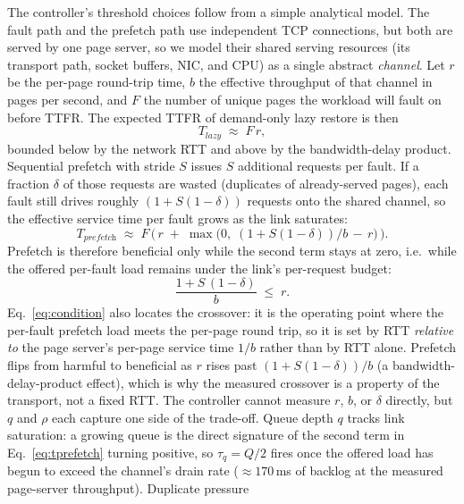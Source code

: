 \documentclass[journal]{IEEEtran}
\newcommand{\qthr}{\ensuremath{\tau_q}}
\begin{document}
The controller's threshold choices follow from a simple analytical model. The
fault path and the prefetch path use independent TCP connections, but both are
served by one page server, so we model their shared serving resources (its
transport path, socket buffers, NIC, and CPU) as a single abstract
\emph{channel}. Let $r$ be the per-page round-trip time, $b$ the
effective throughput of that channel in pages per second, and $F$ the number
of unique pages the workload will fault on before TTFR. The expected TTFR
of demand-only lazy restore is then
\begin{equation}
  T_\textit{lazy} \;\approx\; F \, r,
  \label{eq:tlazy}
\end{equation}
bounded below by the network RTT and above by the bandwidth-delay product.
Sequential prefetch with stride $S$ issues $S$ additional requests per
fault. If a fraction $\delta$ of those requests are wasted (duplicates of
already-served pages), each fault still drives roughly
$(1{+}S(1{-}\delta))$ requests onto the shared channel, so the effective
service time per fault grows as the link saturates:
\begin{equation}
  T_\textit{prefetch} \;\approx\;
  F \,\bigl(\, r \;+\; \max\!\bigl(0,\; (1+S(1{-}\delta))/b \,-\, r \bigr) \,\bigr).
  \label{eq:tprefetch}
\end{equation}
Prefetch is therefore beneficial only while the second term stays at zero,
i.e.\ while the offered per-fault load remains under the link's per-request
budget:
\begin{equation}
  \frac{1 + S\,(1{-}\delta)}{b} \;\le\; r.
  \label{eq:condition}
\end{equation}
Eq.~\eqref{eq:condition} also locates the crossover: it is the operating
point where the per-fault prefetch load meets the per-page round trip, so it
is set by RTT \emph{relative to} the page server's per-page service time
$1/b$ rather than by RTT alone. Prefetch flips from harmful to beneficial as
$r$ rises past $(1+S(1{-}\delta))/b$ (a bandwidth-delay-product effect),
which is why the measured crossover is a property of the transport, not a
fixed RTT.
The controller cannot measure $r$, $b$, or $\delta$ directly, but $q$ and
$\rho$ each capture one side of the trade-off. Queue depth $q$ tracks link
saturation: a growing queue is the direct signature of the second term in
Eq.~\eqref{eq:tprefetch} turning positive, so $\qthr\!=\!Q/2$ fires once the
offered load has begun to exceed the channel's drain rate ($\approx\!170$\,ms
of backlog at the measured page-server throughput). Duplicate pressure
\end{document}
